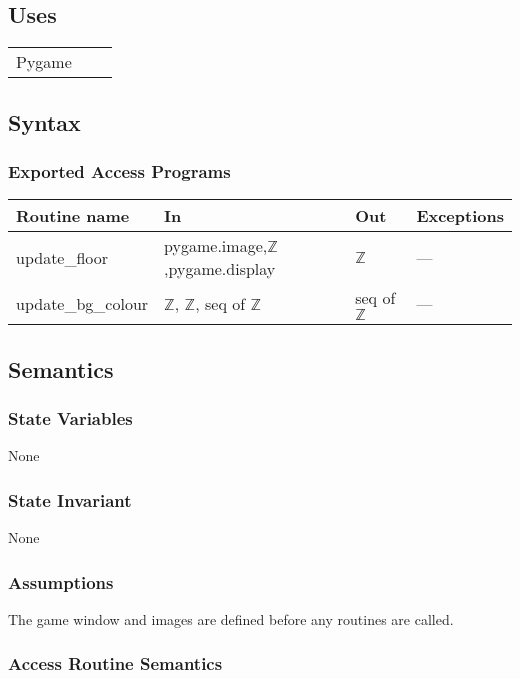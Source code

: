\documentclass[12pt]{article}
\begin{document}
\subsection* {Uses}

\begin{tabular}{lll}
    Pygame
\end{tabular}

\subsection* {Syntax}

\subsubsection* {Exported Access Programs}

\begin{tabular}{| l | l | l | l |}
\hline
\textbf{Routine name} & \textbf{In} & \textbf{Out} & \textbf{Exceptions}\\
\hline
    update\_floor & pygame.image,$\mathbb{Z}$,pygame.display & $\mathbb{Z}$ & ---\\
\hline
    update\_bg\_colour & $\mathbb{Z}$, $\mathbb{Z}$, seq of $\mathbb{Z}$ & seq of $\mathbb{Z}$ & ---\\
\hline
\end{tabular}

\subsection* {Semantics}

\subsubsection* {State Variables}

None

\subsubsection* {State Invariant}

None

\subsubsection* {Assumptions}

The game window and images are defined before any routines are called.

\subsubsection* {Access Routine Semantics}
\end{document}
